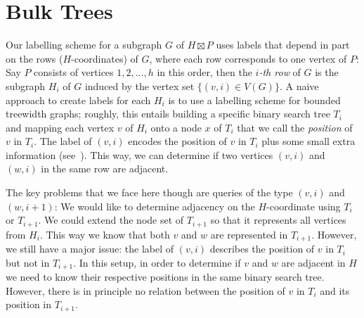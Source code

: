 \documentclass[kpfonts]{patmorin}
\begin{document}


\section{Bulk Trees}

Our labelling scheme for a subgraph $G$ of $H \boxtimes P$ uses labels that depend in part on the rows ($H$-coordinates) of $G$, where each row corresponds to one vertex of $P$: Say $P$ consists of vertices $1, 2, \dots, h$ in this order, then the \emph{$i$-th row} of $G$ is the subgraph $H_i$ of $G$ induced by the vertex set $\{(v, i) \in V(G)\}$.
A naive approach to create labels for each $H_i$ is to use a labelling scheme for bounded treewidth graphs; roughly, this entails building a specific binary search tree $T_i$ and mapping each vertex $v$ of $H_i$ onto a node $x$ of $T_i$ that we call the \emph{position} of $v$ in $T_i$.
The label of $(v, i)$ encodes the position of $v$ in $T_i$ plus some small extra information (see~).
This way, we can determine if two vertices $(v,i)$ and $(w,i)$ in the same row are adjacent.

The key problems that we face here though are queries of the type $(v,i)$ and $(w,i+1)$: We would like to determine adjacency on the $H$-coordinate using $T_i$ or $T_{i+1}$.
We could extend the node set of $T_{i+1}$ so that it represents all vertices from $H_{i}$. This way we know that both $v$ and $w$ are represented in $T_{i+1}$.
However, we still have a major issue: the label of $(v,i)$ describes the position of $v$ in $T_i$ but not in $T_{i+1}$.
In this setup, in order to determine if $v$ and $w$ are adjacent in $H$ we need to know their respective positions in the same binary search tree.
However, there is in principle no relation between the position of $v$ in $T_i$ and its position in $T_{i+1}$.
\end{document}
